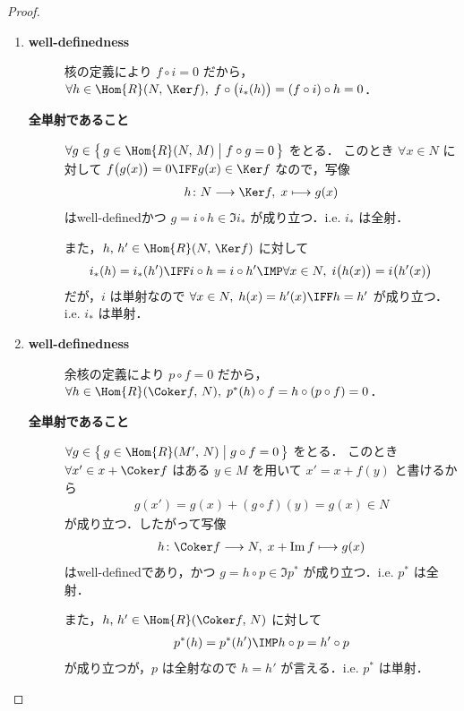 \documentclass[algtopo_main]{subfiles}
\begin{document}
\begin{proof}
	\begin{enumerate}
		\item \begin{description}
			\item[\textbf{well-definedness}] 核の定義により $f \circ i = 0$ だから，$\forall h \in \Hom{R}(N,\, \Ker f),\; f \circ \bigl(i_*(h)\bigr) = (f \circ i) \circ h = 0$．
			\item[\textbf{全単射であること}] $\forall g\in \bigl\{\, g \in \Hom{R}(N,\, M) \bigm| f \circ g = 0 \,\bigr\}$ をとる．
			このとき $\forall x \in N$ に対して $f \bigl( g(x) \bigr) = 0 \IFF g(x) \in \Ker f$ なので，写像
			\begin{align}
				h \colon N \lto \Ker f,\; x \lmto g(x)
			\end{align}
			はwell-definedかつ $g = i \circ h \in \Im i_*$ が成り立つ．i.e. $i_*$ は全射．

			また，$h,\, h' \in \Hom{R}(N,\, \Ker f)$ に対して
			\begin{align}
				i_*(h) = i_*(h') \IFF i \circ h = i \circ h' \IMP \forall x \in N,\; i \bigl( h(x) \bigr) = i \bigl( h'(x) \bigr)
			\end{align}
			だが，$i$ は単射なので $\forall x \in N,\; h(x) = h'(x) \IFF h = h'$ が成り立つ．i.e. $i_*$ は単射．
		\end{description}
		\item \begin{description}
			\item[\textbf{well-definedness}] 余核の定義により $p \circ f  = 0$ だから，$\forall h \in \Hom{R}(\Coker f,\, N),\; p^*(h) \circ f = h \circ (p \circ f) = 0$．
			\item[\textbf{全単射であること}] $\forall g \in \bigl\{\, g \in \Hom{R}(M',\, N) \bigm| g \circ f = 0 \,\bigr\} $ をとる．
			このとき $\forall x' \in x + \Coker f$ はある $y \in M$ を用いて $x' = x + f(y)$ と書けるから
			\begin{align}
				g(x') = g(x) + (g \circ f)(y) = g(x) \in N
			\end{align}
			が成り立つ．したがって写像
			\begin{align}
				h \colon \Coker f \lto N,\; x + \Im f \lmto g(x)
			\end{align}
			はwell-definedであり，かつ $g = h \circ p \in \Im p^*$ が成り立つ．i.e. $p^*$ は全射．

			また，$h,\, h' \in \Hom{R}(\Coker f,\, N)$ に対して
			\begin{align}
				p^*(h) = p^*(h') \IMP h \circ p = h' \circ p
			\end{align}
			が成り立つが，$p$ は全射なので $h = h'$ が言える．i.e. $p^*$ は単射．
		\end{description}
	\end{enumerate}
\end{proof}
\end{document}
